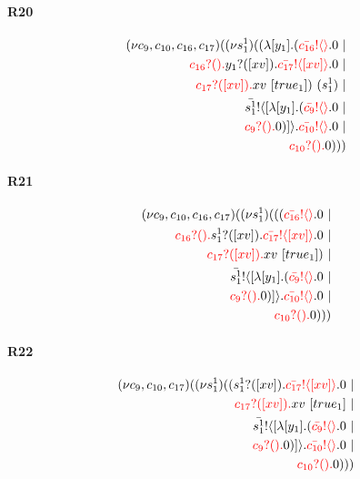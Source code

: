 \documentclass{article}
\begin{document}
\paragraph{R20}
\begin{align*}
 (\nu c_{9},c_{10},c_{16},c_{17})( (\nu s^{1}_{1})(( \lambda [y_{1}].(\color{red}\bar{c_{16}}! \langle  \rangle \color{black}.0  \ | \\ \color{red}c_{16}?().\color{black}\color{black}y_{1}?([xv]).\color{black}\color{red}\bar{c_{17}}! \langle [xv] \rangle \color{black}.0  \ | \\ \color{red}c_{17}?([xv]).\color{black}xv \ [true_{1}]) \ (s^{1}_{1}) \ | \\ \color{black}\bar{s^{1}_{1}}! \langle [ \lambda [y_{1}].(\color{red}\bar{c_{9}}! \langle  \rangle \color{black}.0  \ | \\ \color{red}c_{9}?().\color{black}0 )] \rangle \color{black}.\color{red}\bar{c_{10}}! \langle  \rangle \color{black}.0  \ | \\ \color{red}c_{10}?().\color{black}0 )))
\end{align*}
\paragraph{R21}
\begin{align*}
 (\nu c_{9},c_{10},c_{16},c_{17})( (\nu s^{1}_{1})(((\color{red}\bar{c_{16}}! \langle  \rangle \color{black}.0  \ | \\ \color{red}c_{16}?().\color{black}\color{black}s^{1}_{1}?([xv]).\color{black}\color{red}\bar{c_{17}}! \langle [xv] \rangle \color{black}.0  \ | \\ \color{red}c_{17}?([xv]).\color{black}xv \ [true_{1}]) \ | \\ \color{black}\bar{s^{1}_{1}}! \langle [ \lambda [y_{1}].(\color{red}\bar{c_{9}}! \langle  \rangle \color{black}.0  \ | \\ \color{red}c_{9}?().\color{black}0 )] \rangle \color{black}.\color{red}\bar{c_{10}}! \langle  \rangle \color{black}.0  \ | \\ \color{red}c_{10}?().\color{black}0 )))
\end{align*}
\paragraph{R22}
\begin{align*}
 (\nu c_{9},c_{10},c_{17})( (\nu s^{1}_{1})((\color{black}s^{1}_{1}?([xv]).\color{black}\color{red}\bar{c_{17}}! \langle [xv] \rangle \color{black}.0  \ | \\ \color{red}c_{17}?([xv]).\color{black}xv \ [true_{1}] \ | \\ \color{black}\bar{s^{1}_{1}}! \langle [ \lambda [y_{1}].(\color{red}\bar{c_{9}}! \langle  \rangle \color{black}.0  \ | \\ \color{red}c_{9}?().\color{black}0 )] \rangle \color{black}.\color{red}\bar{c_{10}}! \langle  \rangle \color{black}.0  \ | \\ \color{red}c_{10}?().\color{black}0 )))
\end{align*}
\end{document}
